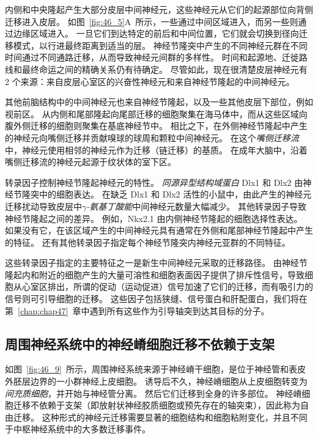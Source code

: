 内侧和中央隆起产生大部分皮层中间神经元，这些神经元从它们的起源部位向背侧迁移进入皮层。
如图~\ref{fig:46_5}A~所示，一些通过中间区域进入，而另一些则通过边缘区域进入。
一旦它们到达特定的前后和中间位置，它们就会切换到径向迁移模式，以行进最终距离到适当的层。
神经节隆突中产生的不同神经元群在不同时间通过不同通路迁移，从而导致神经元间群的多样性。
时间和起源地、迁徙路线和最终命运之间的精确关系仍有待确定。
尽管如此，现在很清楚皮层神经元有 2 个来源：来自皮层心室区的兴奋性神经元和来自神经节隆起的中间神经元。


其他前脑结构中的中间神经元也来自神经节隆起，以及一些其他皮层下部位，例如视前区。
从内侧和尾部隆起向尾部迁移的细胞聚集在海马体中，而从这些区域向腹外侧迁移的细胞则聚集在基底神经节中。 
相比之下，在外侧神经节隆起中产生的神经元向嘴侧迁移并贡献嗅球的球周和颗粒中间神经元。
在这个\textit{嘴侧迁移流}中，神经元使用相邻的神经元作为迁移（链迁移）的基质。
在成年大脑中，沿着嘴侧迁移流的神经元起源于纹状体的室下区。


转录因子控制神经节隆起神经元的特性。
\textit{同源异型结构域蛋白} Dlx1 和 Dlx2 由神经节隆突中的细胞表达。
在缺乏 Dlx1 和 Dlx2 活性的小鼠中，由此产生的神经元迁移扰动导致皮层中\textit{$\gamma$-氨基丁酸能}中间神经元数量大幅减少。
其他转录因子导致神经节隆起之间的差异。
例如，Nkx2.1 由内侧神经节隆起的细胞选择性表达。
如果没有它，在该区域产生的中间神经元具有通常在外侧和尾部神经节隆起中产生的特征。
还有其他转录因子指定每个神经节隆突内神经元亚群的不同特征。


这些转录因子指定的主要特征之一是新生中间神经元采取的迁移路径。
由神经节隆起内和附近的细胞产生的大量可溶性和细胞表面因子提供了排斥性信号，导致细胞从心室区排出，所谓的促动（运动促进）信号加速了它们的迁移，而有吸引力的信号则可引导细胞的迁移。
这些因子包括狭缝、信号蛋白和肝配蛋白，我们将在第~\ref{chap:chap47}~章中遇到所有这些作为引导轴突到达其目标的分子。



\subsection{周围神经系统中的神经嵴细胞迁移不依赖于支架}

如图~\ref{fig:46_9}~所示，周围神经系统来源于神经嵴干细胞，是位于神经管和表皮外胚层边界的一小群神经上皮细胞。
诱导后不久，神经嵴细胞从上皮细胞转变为\textit{间充质细胞}，并开始与神经管分离。
然后它们迁移到全身的许多部位。
神经嵴细胞迁移不依赖于支架（即放射状神经胶质细胞或预先存在的轴突束），因此称为自由迁移。
这种形式的神经元迁移需要显著的细胞结构和细胞粘附变化，并且不同于中枢神经系统中的大多数迁移事件。


